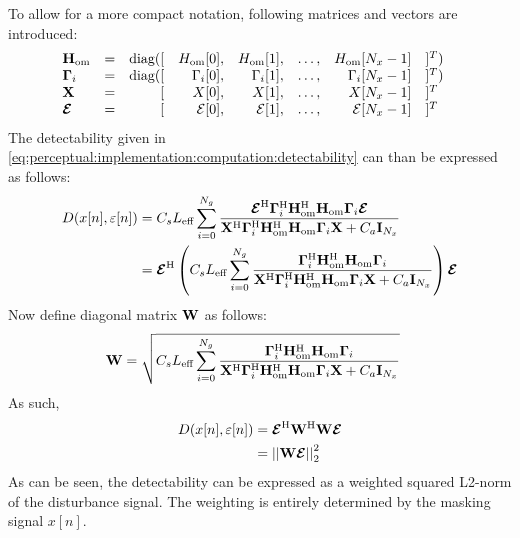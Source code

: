 To allow for a more compact notation, following matrices and vectors are introduced:
\begin{equation}
    \begin{array}{llrrrrrll}
        \mathbf{H}_\text{om}   &=  &\text{diag}([& H_\text{om}[0],& H_\text{om}[1],&    \hdots,& H_\text{om}[N_x - 1]&]^T)& \\
        \mathbf{\Gamma}_i      &=  &\text{diag}([&    \Gamma_i[0],&    \Gamma_i[1],&    \hdots,&    \Gamma_i[N_x - 1]&]^T)& \\
        \mathbf{X}             &=  &            [&           X[0],&           X[1],&    \hdots,&           X[N_x - 1]&]^T& \\
  \boldsymbol{\mathcal{E}}   &=  &            [& \mathcal{E}[0],& \mathcal{E}[1],&    \hdots,& \mathcal{E}[N_x - 1]&]^T& \\
    \end{array}
\end{equation}
The detectability given in \autoref{eq:perceptual:implementation:computation:detectability} can than be expressed as follows:
\begin{align}
    D(x[n],\varepsilon[n]) &= C_s L_\text{eff}\sum_{i=0}^{N_g} 
        \frac{\boldsymbol{\mathcal{E}}^{\text{H}}\mathbf{\Gamma}_i^{\text{H}}\mathbf{H}_\text{om}^{\text{H}}\mathbf{H}_\text{om}\mathbf{\Gamma}_i\boldsymbol{\mathcal{E}}}
        {\mathbf{X}^{\text{H}}\mathbf{\Gamma}_i^{\text{H}}\mathbf{H}_\text{om}^{\text{H}}\mathbf{H}_\text{om}\mathbf{\Gamma}_i\mathbf{X} + C_a\mathbf{I}_{N_x}} \\
                           &= \boldsymbol{\mathcal{E}}^{\text{H}}\left(C_s L_\text{eff}\sum_{i=0}^{N_g} 
        \frac{\mathbf{\Gamma}_i^{\text{H}}\mathbf{H}_\text{om}^{\text{H}}\mathbf{H}_\text{om}\mathbf{\Gamma}_i}
        {\mathbf{X}^{\text{H}}\mathbf{\Gamma}_i^{\text{H}}\mathbf{H}_\text{om}^{\text{H}}\mathbf{H}_\text{om}\mathbf{\Gamma}_i\mathbf{X} + C_a\mathbf{I}_{N_x}}\right)\boldsymbol{\mathcal{E}}
\end{align}
Now define diagonal matrix $\mathbf{W}$ as follows: 
\begin{align}
    \mathbf{W} &= \sqrt{C_s L_\text{eff}\sum_{i=0}^{N_g} 
        \frac{\mathbf{\Gamma}_i^{\text{H}}\mathbf{H}_\text{om}^{\text{H}}\mathbf{H}_\text{om}\mathbf{\Gamma}_i}
    {\mathbf{X}^{\text{H}}\mathbf{\Gamma}_i^{\text{H}}\mathbf{H}_\text{om}^{\text{H}}\mathbf{H}_\text{om}\mathbf{\Gamma}_i\mathbf{X} + C_a\mathbf{I}_{N_x}}}
\end{align}
As such, 
\begin{align}
    D(x[n],\varepsilon[n]) &= \vecsymbol{\mathcal{E}}\herm\mat{W}\herm\mat{W}\vecsymbol{\mathcal{E}} \\
                           &= \norm[2][2]{\mat{W}\vecsymbol{\mathcal{E}}} 
\end{align}
As can be seen, the detectability can be expressed as a weighted squared L2-norm of the disturbance signal. 
The weighting is entirely determined by the masking signal $x[n]$. 


